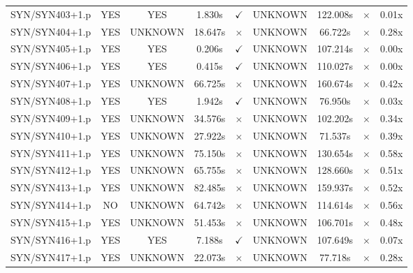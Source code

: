 \documentclass[a4paper,10pt]{article}
\begin{document}
\begin{longtable}{lcccccccc}
SYN/SYN403+1.p & YES & YES & 1.830s & \cellcolor{matchcolor}$\checkmark$ & UNKNOWN & 122.008s & \cellcolor{mismatchcolor}$\times$ & 0.01x \\
SYN/SYN404+1.p & YES & UNKNOWN & 18.647s & \cellcolor{mismatchcolor}$\times$ & UNKNOWN & 66.722s & \cellcolor{mismatchcolor}$\times$ & 0.28x \\
SYN/SYN405+1.p & YES & YES & 0.206s & \cellcolor{matchcolor}$\checkmark$ & UNKNOWN & 107.214s & \cellcolor{mismatchcolor}$\times$ & 0.00x \\
SYN/SYN406+1.p & YES & YES & 0.415s & \cellcolor{matchcolor}$\checkmark$ & UNKNOWN & 110.027s & \cellcolor{mismatchcolor}$\times$ & 0.00x \\
SYN/SYN407+1.p & YES & UNKNOWN & 66.725s & \cellcolor{mismatchcolor}$\times$ & UNKNOWN & 160.674s & \cellcolor{mismatchcolor}$\times$ & 0.42x \\
SYN/SYN408+1.p & YES & YES & 1.942s & \cellcolor{matchcolor}$\checkmark$ & UNKNOWN & 76.950s & \cellcolor{mismatchcolor}$\times$ & 0.03x \\
SYN/SYN409+1.p & YES & UNKNOWN & 34.576s & \cellcolor{mismatchcolor}$\times$ & UNKNOWN & 102.202s & \cellcolor{mismatchcolor}$\times$ & 0.34x \\
SYN/SYN410+1.p & YES & UNKNOWN & 27.922s & \cellcolor{mismatchcolor}$\times$ & UNKNOWN & 71.537s & \cellcolor{mismatchcolor}$\times$ & 0.39x \\
SYN/SYN411+1.p & YES & UNKNOWN & 75.150s & \cellcolor{mismatchcolor}$\times$ & UNKNOWN & 130.654s & \cellcolor{mismatchcolor}$\times$ & 0.58x \\
SYN/SYN412+1.p & YES & UNKNOWN & 65.755s & \cellcolor{mismatchcolor}$\times$ & UNKNOWN & 128.660s & \cellcolor{mismatchcolor}$\times$ & 0.51x \\
SYN/SYN413+1.p & YES & UNKNOWN & 82.485s & \cellcolor{mismatchcolor}$\times$ & UNKNOWN & 159.937s & \cellcolor{mismatchcolor}$\times$ & 0.52x \\
SYN/SYN414+1.p & NO & UNKNOWN & 64.742s & \cellcolor{mismatchcolor}$\times$ & UNKNOWN & 114.614s & \cellcolor{mismatchcolor}$\times$ & 0.56x \\
SYN/SYN415+1.p & YES & UNKNOWN & 51.453s & \cellcolor{mismatchcolor}$\times$ & UNKNOWN & 106.701s & \cellcolor{mismatchcolor}$\times$ & 0.48x \\
SYN/SYN416+1.p & YES & YES & 7.188s & \cellcolor{matchcolor}$\checkmark$ & UNKNOWN & 107.649s & \cellcolor{mismatchcolor}$\times$ & 0.07x \\
SYN/SYN417+1.p & YES & UNKNOWN & 22.073s & \cellcolor{mismatchcolor}$\times$ & UNKNOWN & 77.718s & \cellcolor{mismatchcolor}$\times$ & 0.28x \\

\end{longtable}
\end{document}
